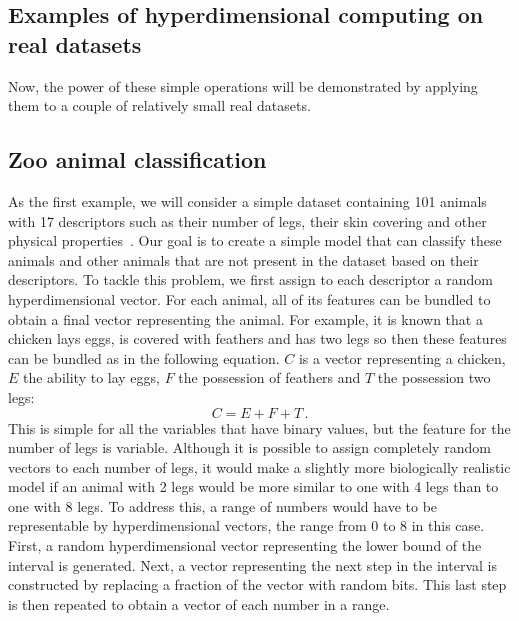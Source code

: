 \subsection*{Examples of hyperdimensional computing on real datasets}
\label{sec:example}
Now, the power of these simple operations will be demonstrated by applying them to a couple of relatively small real datasets.
\subsection*{Zoo animal classification}
As the first example, we will consider a simple dataset containing 101 animals with 17 descriptors such as their number of legs, their skin covering and other physical properties~\cite{zoo}. Our goal is to create a simple model that can classify these animals and other animals that are not present in the dataset based on their descriptors. To tackle this problem, we first assign to each descriptor a random hyperdimensional vector. For each animal, all of its features can be bundled to obtain a final vector representing the animal. For example, it is known that a chicken lays eggs, is covered with feathers and has two legs so then these features can be bundled as in the following equation. $C$ is a vector representing a chicken, $E$ the ability to lay eggs, $F$ the possession of feathers and $T$ the possession two legs:
\begin{equation}\label{eqn:chicken}
    C = E + F + T\,.
\end{equation}
This is simple for all the variables that have binary values, but the feature for the number of legs is variable. Although it is possible to assign completely random vectors to each number of legs, it would make a slightly more biologically realistic model if an animal with 2 legs would be more similar to one with 4 legs than to one with 8 legs. To address this, a range of numbers would have to be representable by hyperdimensional vectors, the range from 0 to 8 in this case. First, a random hyperdimensional vector representing the lower bound of the interval is generated. Next, a vector representing the next step in the interval is constructed by replacing a fraction of the vector with random bits. This last step is then repeated to obtain a vector of each number in a range.

